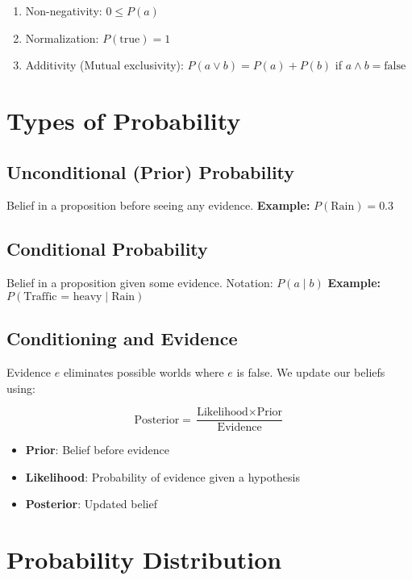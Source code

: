 \begin{enumerate}
    \item Non-negativity: \( 0 \leq P(a) \)
    \item Normalization: \( P(\text{true}) = 1 \)
    \item Additivity (Mutual exclusivity): \( P(a \vee b) = P(a) + P(b) \) if \( a \wedge b = \text{false} \)
\end{enumerate}

\section{Types of Probability}

\subsection*{Unconditional (Prior) Probability}

Belief in a proposition before seeing any evidence.  
\textbf{Example:} \( P(\text{Rain}) = 0.3 \)

\subsection*{Conditional Probability}

Belief in a proposition given some evidence.  
Notation: \( P(a \mid b) \)  
\textbf{Example:} \( P(\text{Traffic = heavy} \mid \text{Rain}) \)

\subsection*{Conditioning and Evidence}

Evidence \( e \) eliminates possible worlds where \( e \) is false.  
We update our beliefs using:

\[
\text{Posterior} = \frac{\text{Likelihood} \times \text{Prior}}{\text{Evidence}}
\]

\begin{itemize}
    \item \textbf{Prior}: Belief before evidence
    \item \textbf{Likelihood}: Probability of evidence given a hypothesis
    \item \textbf{Posterior}: Updated belief
\end{itemize}

\section{Probability Distribution}

